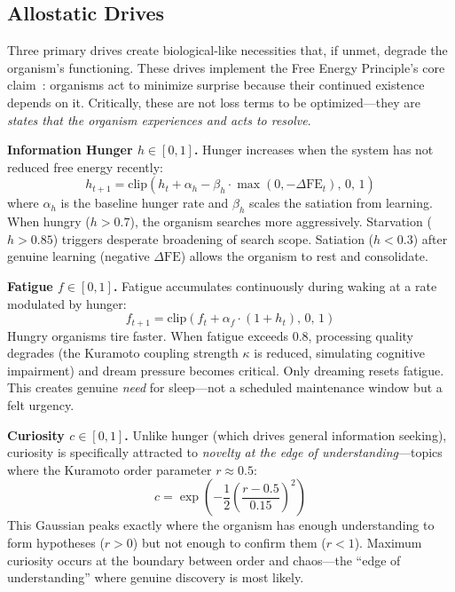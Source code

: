 \documentclass[11pt,a4paper,twocolumn]{article}
\begin{document}
\subsection{Allostatic Drives}

Three primary drives create biological-like necessities that, if unmet, degrade the organism's functioning.
These drives implement the Free Energy Principle's core claim~\cite{friston2010}: organisms act to minimize surprise because their continued existence depends on it.
Critically, these are not loss terms to be optimized---they are \emph{states that the organism experiences and acts to resolve}.

\textbf{Information Hunger $h \in [0, 1]$.}
Hunger increases when the system has not reduced free energy recently:
\begin{equation}
h_{t+1} = \mathrm{clip}\!\left(h_t + \alpha_h - \beta_h \cdot \max(0, -\Delta\mathrm{FE}_t), \, 0, \, 1\right)
\label{eq:hunger}
\end{equation}
where $\alpha_h$ is the baseline hunger rate and $\beta_h$ scales the satiation from learning.
When hungry ($h > 0.7$), the organism searches more aggressively.
Starvation ($h > 0.85$) triggers desperate broadening of search scope.
Satiation ($h < 0.3$) after genuine learning (negative $\Delta\mathrm{FE}$) allows the organism to rest and consolidate.

\textbf{Fatigue $f \in [0, 1]$.}
Fatigue accumulates continuously during waking at a rate modulated by hunger:
\begin{equation}
f_{t+1} = \mathrm{clip}\!\left(f_t + \alpha_f \cdot (1 + h_t), \, 0, \, 1\right)
\label{eq:fatigue}
\end{equation}
Hungry organisms tire faster.
When fatigue exceeds 0.8, processing quality degrades (the Kuramoto coupling strength $\kappa$ is reduced, simulating cognitive impairment) and dream pressure becomes critical.
Only dreaming resets fatigue.
This creates genuine \emph{need} for sleep---not a scheduled maintenance window but a felt urgency.

\textbf{Curiosity $c \in [0, 1]$.}
Unlike hunger (which drives general information seeking), curiosity is specifically attracted to \emph{novelty at the edge of understanding}---topics where the Kuramoto order parameter $r \approx 0.5$:
\begin{equation}
c = \exp\!\left(-\frac{1}{2}\left(\frac{r - 0.5}{0.15}\right)^{\!2}\right)
\label{eq:curiosity}
\end{equation}
This Gaussian peaks exactly where the organism has enough understanding to form hypotheses ($r > 0$) but not enough to confirm them ($r < 1$).
Maximum curiosity occurs at the boundary between order and chaos---the ``edge of understanding'' where genuine discovery is most likely.
\end{document}
